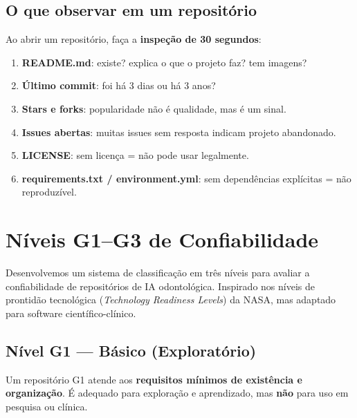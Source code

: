  


\subsection{O que observar em um repositório}

Ao abrir um repositório, faça a \textbf{inspeção de 30 segundos}:

\begin{enumerate}
  \item \textbf{README.md}: existe? explica o que o projeto faz? tem imagens?
  \item \textbf{Último commit}: foi há 3 dias ou há 3 anos?
  \item \textbf{Stars e forks}: popularidade não é qualidade, mas é um sinal.
  \item \textbf{Issues abertas}: muitas issues sem resposta indicam projeto abandonado.
  \item \textbf{LICENSE}: sem licença = não pode usar legalmente.
  \item \textbf{requirements.txt / environment.yml}: sem dependências explícitas = não reproduzível.
\end{enumerate}

\section{Níveis G1--G3 de Confiabilidade}

Desenvolvemos um sistema de classificação em três níveis para avaliar a
confiabilidade de repositórios de IA odontológica. Inspirado nos níveis
de prontidão tecnológica (\textit{Technology Readiness Levels}) da NASA,
mas adaptado para software científico-clínico.

 

\subsection{Nível G1 — Básico (Exploratório)}

Um repositório G1 atende aos \textbf{requisitos mínimos de existência e
organização}. É adequado para exploração e aprendizado, mas \textbf{não}
para uso em pesquisa ou clínica.


